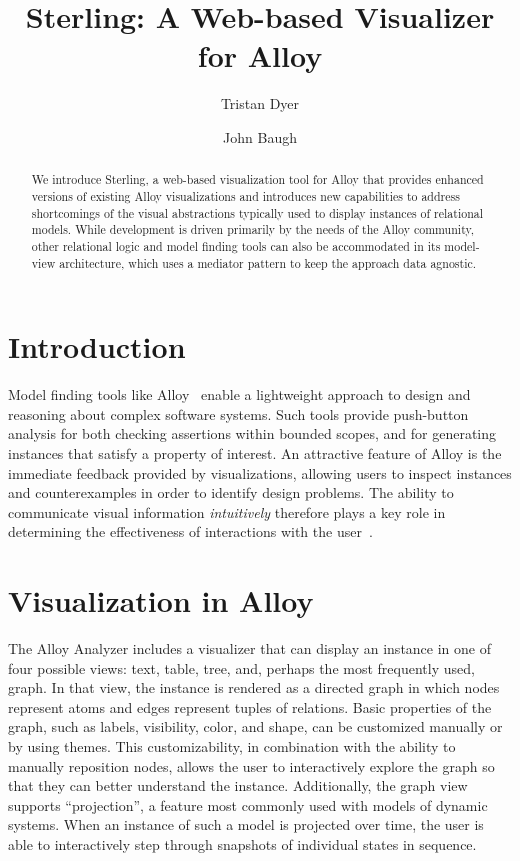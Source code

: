 \documentclass[runningheads]{llncs}
\begin{document}
\title{Sterling: A Web-based Visualizer for Alloy}
\author{Tristan Dyer  \and John Baugh }



\maketitle

\begin{abstract}
We introduce Sterling, a web-based visualization tool for Alloy that provides enhanced versions of existing Alloy visualizations and introduces new capabilities to address shortcomings of the visual abstractions typically used to display instances of relational models. While development is driven primarily by the needs of the Alloy community, other relational logic and model finding tools can also be accommodated in its model-view architecture, which uses a mediator pattern to keep the approach data agnostic.
\end{abstract}

\section{Introduction}
\label{introduction}

Model finding tools like Alloy~\cite{jackson2012} enable a lightweight approach to design and reasoning about complex software systems. Such tools provide push-button analysis for both checking assertions within bounded scopes, and for generating instances that satisfy a property of interest. An attractive feature of Alloy is the immediate feedback provided by visualizations, allowing users to inspect instances and counterexamples in order to identify design problems. The ability to communicate visual information \emph{intuitively} therefore plays a key role in determining the effectiveness of interactions with the user~\cite{gammaitoni2014}.

\section{Visualization in Alloy}
\label{alloy-vis}

The Alloy Analyzer includes a visualizer that can display an instance in one of four possible views: text, table, tree, and, perhaps the most frequently used, graph. In that view, the instance is rendered as a directed graph in which nodes represent atoms and edges represent tuples of relations. Basic properties of the graph, such as labels, visibility, color, and shape, can be customized manually or by using themes.
This customizability, in combination with the ability to manually reposition nodes, allows the user to interactively explore the graph so that they can better understand the instance. 
Additionally, the graph view supports ``projection'', a feature most commonly used with models of dynamic systems. When an instance of such a model is projected over time, the user is able to interactively step through snapshots of individual states in sequence.
\end{document}
